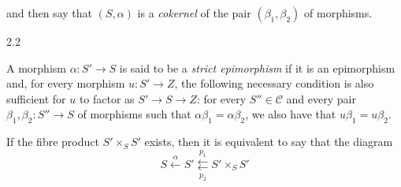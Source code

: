   and then say that \((S,\alpha )\) is a \emph{cokernel} of the pair \((\beta _1,\beta _2)\) of morphisms.\begin{definition}{2.2}\label{fga3.i-a.2-definition-2.2}\skipsinglepar\par{}A morphism \(\alpha \colon  S'\to  S\) is said to be a \emph{strict epimorphism} if it is an epimorphism and, for every morphism \(u\colon  S'\to  Z\), the following necessary condition is also sufficient for \(u\) to factor as \(S'\to  S\to  Z\):
    for every \(S''\in \mathcal {C}\) and every pair \(\beta _1,\beta _2\colon  S''\to  S\) of morphisms such that \(\alpha \beta _1=\alpha \beta _2\), we also have that \(u\beta _1=u\beta _2\).\end{definition}\par{}If the fibre product \(S'\times _S S'\) exists, then it is equivalent to say that the diagram
  \[     S \xleftarrow {\alpha }     S' \overset {p_1}{\underset {p_2}{\leftleftarrows }}     S'\times _S S'   \]
  
